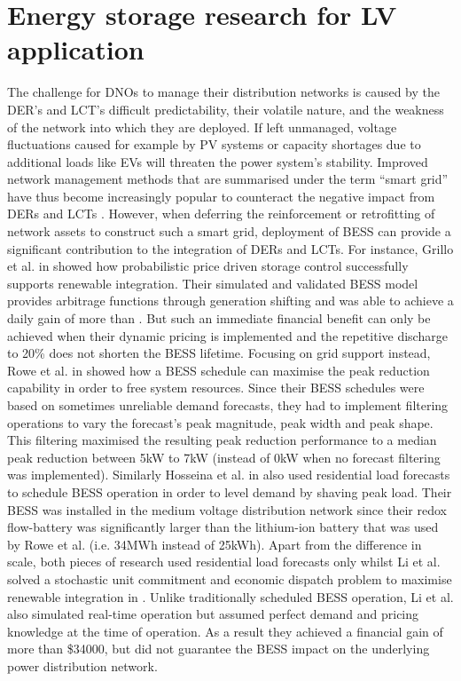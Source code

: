 \section{Energy storage research for LV application}
\label{ch-literature:sec:energy-storage}

The challenge for DNOs to manage their distribution networks is caused by the DER's and LCT's difficult predictability, their volatile nature, and the weakness of the network into which they are deployed.
If left unmanaged, voltage fluctuations caused for example by PV systems \cite{Woyte2006, Bravo2015} or capacity shortages due to additional loads like EVs \cite{Mohd2008a, Koureoumpezis2010} will threaten the power system's stability.
Improved network management methods that are summarised under the term ``smart grid'' have thus become increasingly popular to counteract the negative impact from DERs and LCTs \cite{Panteli2015}.
However, when deferring the reinforcement or retrofitting of network assets to construct such a smart grid, deployment of BESS can provide a significant contribution to the integration of DERs and LCTs.
For instance, Grillo et al. in \cite{Grillo2012} showed how probabilistic price driven storage control successfully supports renewable integration.
Their simulated and validated BESS model provides arbitrage functions through generation shifting and was able to achieve a daily gain of more than .
But such an immediate financial benefit can only be achieved when their dynamic pricing is implemented and the repetitive discharge to 20\% does not shorten the BESS lifetime.
Focusing on grid support instead, Rowe et al. in \cite{Rowe2014a} showed how a BESS schedule can maximise the peak reduction capability in order to free system resources.
Since their BESS schedules were based on sometimes unreliable demand forecasts, they had to implement filtering operations to vary the forecast's peak magnitude, peak width and peak shape.
This filtering maximised the resulting peak reduction performance to a median peak reduction between 5kW to 7kW (instead of 0kW when no forecast filtering was implemented).
Similarly Hosseina et al. in \cite{Hosseina2016a} also used residential load forecasts to schedule BESS operation in order to level demand by shaving peak load.
Their BESS was installed in the medium voltage distribution network since their redox flow-battery was significantly larger than the lithium-ion battery that was used by Rowe et al. (i.e. 34MWh instead of 25kWh).
Apart from the difference in scale, both pieces of research used residential load forecasts only whilst Li et al. solved a stochastic unit commitment and economic dispatch problem to maximise renewable integration in \cite{Li2016}.
Unlike traditionally scheduled BESS operation, Li et al. also simulated real-time operation but assumed perfect demand and pricing knowledge at the time of operation.
As a result they achieved a financial gain of more than \$34000, but did not guarantee the BESS impact on the underlying power distribution network.

